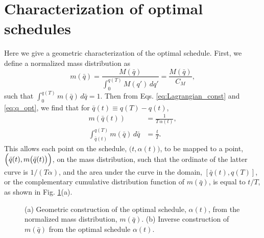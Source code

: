 \documentclass[reprint, superscriptaddress, floatfix]{revtex4-1}
\begin{document}
\section{\label{sec:schedule_geometry}
Characterization of optimal schedules}



Here we give a geometric characterization
of the optimal schedule.
%
First, we define a normalized mass distribution as
%
\begin{equation}
  m(\bar q)
  =
  \frac{
    M(\bar q)
  }
  {
    \int_0^{ q(T) } M(q') \, d q'
  }
  =
  \frac{
    M(\bar q)
  }
  {
    C_M
  }
  ,
  \label{eq:mass_distr}
\end{equation}
%
such that
$\int_0^{q(T)} m(\bar q) \, d\bar q = 1$.
%
Then from Eqs. \eqref{eq:Lagrangian_const} and \eqref{eq:q_opt},
we find that for $\bar q(t) \equiv q(T) - q(t)$,
%
\begin{align}
  m\left( \bar q(t) \right)
  &=
  \frac{ 1 }
       { T \, \alpha(t) }
  ,
  \label{eq:mQ_invTa}
  \\
  \int_{\bar q(t)}^{ q(T) }
    m(\bar q) \, d \bar q
  &=
  \frac t T
  .
  \label{eq:intmQ_tT}
\end{align}
%
This allows each point on the schedule,
$\bigl(t, \alpha(t)\bigr)$,
to be mapped to a point,
$\Bigl(\bar q(t), m\bigl(\bar q(t)\bigr)\Bigr)$,
on the mass distribution,
such that the ordinate of the latter curve
is $1/(T\alpha)$,
and the area under the curve in the domain, $[\bar q(t), q(T)]$,
or the complementary cumulative distribution function of $m(\bar q)$,
is equal to $t/T$,
as shown in Fig. \ref{fig:massq}(a).

\begin{figure}[h]\centering
  \caption{
    \label{fig:massq}
    (a) Geometric construction of the optimal schedule,
    $\alpha(t)$,
    from the normalized mass distribution,
    $m(\bar q)$.
    (b) Inverse construction of $m(\bar q)$
    from the optimal schedule $\alpha(t)$.
  }
\end{figure}
\end{document}
